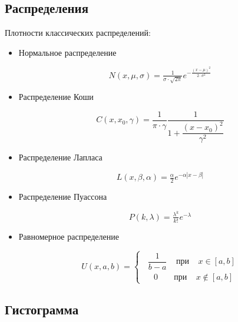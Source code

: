 \documentclass[report.tex]{subfiles}
\begin{document}
  
\subsection{Распределения}
Плотности классических распределений:

\begin{itemize}
  \item Нормальное распределение
  
  \begin{equation}
      N(x, \mu, \sigma) = \tfrac{1}{\sigma\cdot \sqrt{2\pi}}e^{-\tfrac{(x - \mu)^2}{2\cdot \sigma^2}}
  \end{equation}
  
  \item Распределение Коши
  
   \begin{equation}
      C(x, x_0, \gamma) = \dfrac{1}{\pi\cdot \gamma}\dfrac{1}{1 + \dfrac{(x - x_0)^2}{\gamma^2}}
  \end{equation}
  
  \item Распределение Лапласа
  
  \begin{equation}
      L(x, \beta, \alpha) =\tfrac{\alpha}{2}e^{-\alpha|x - \beta|}
  \end{equation}
  
  \item Распределение Пуассона
  
  \begin{equation}
      P(k, \lambda) = \tfrac{\lambda^k}{k!}e^{-\lambda}
  \end{equation}
  
  \item Равномерное распределение
  
    \begin{equation}
      U(x, a, b) =
        \begin{cases} 
            \;\; \dfrac{1}{b - a} \;\;\;\; \text{при} \;\;\;\; x \in [a, b]\\
            \,\,\,\:\;\; 0 \;\;\;\;\;\;\; \text{при} \;\;\;\; x \not\in [a, b]
        \end{cases}
  \end{equation}
  
\end{itemize}

\subsection{Гистограмма}
\end{document}
